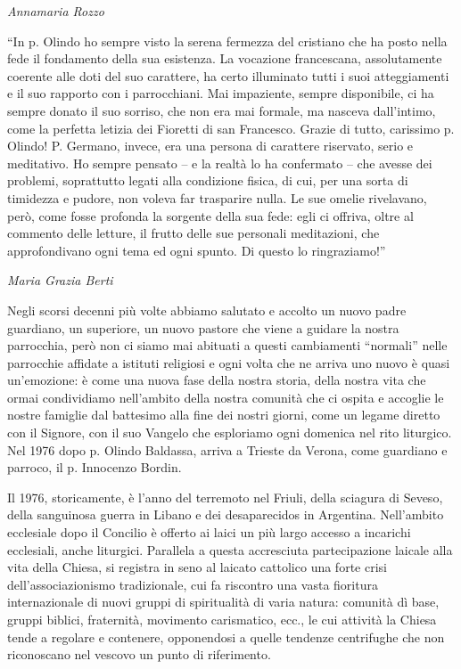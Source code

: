 \begin{flushright}
\textit{Annamaria Rozzo}
\end{flushright}
“In p. Olindo ho sempre visto la serena fermezza del cristiano che ha posto nella fede il 
fondamento della sua esistenza. La vocazione francescana, assolutamente coerente alle doti del suo 
carattere, ha certo illuminato tutti i suoi atteggiamenti e il suo rapporto con i parrocchiani. Mai 
impaziente, sempre disponibile, ci ha sempre donato il suo sorriso, che non era mai formale, ma 
nasceva dall’intimo, come la perfetta letizia dei Fioretti di san Francesco.
Grazie di tutto, carissimo p. Olindo! 
\medbreak
P. Germano, invece, era una persona di carattere riservato, serio e meditativo. Ho sempre 
pensato – e la realtà lo ha confermato – che avesse dei problemi, soprattutto legati alla condizione 
fisica, di cui, per una sorta di timidezza e pudore, non voleva far trasparire nulla. Le sue omelie 
rivelavano, però, come fosse profonda la sorgente della sua fede: egli ci offriva, oltre al commento 
delle letture, il frutto delle sue personali meditazioni, che approfondivano ogni tema ed ogni spunto.
Di questo lo ringraziamo!”
\begin{flushright}
\textit{Maria Grazia Berti}
\end{flushright}
Negli scorsi decenni più volte abbiamo salutato e accolto un nuovo padre guardiano, un  
superiore, un nuovo pastore che viene a guidare la nostra parrocchia, però non ci siamo mai abituati 
a questi cambiamenti “normali” nelle parrocchie affidate a istituti religiosi e ogni volta che ne arriva 
uno nuovo è quasi un’emozione: è come una nuova fase della nostra storia, della nostra vita che 
ormai condividiamo nell’ambito della nostra comunità che ci ospita e accoglie le nostre famiglie dal 
battesimo alla fine dei nostri giorni, come un legame diretto con il Signore, con il suo Vangelo che 
esploriamo ogni domenica nel rito liturgico. Nel 1976 dopo p. Olindo Baldassa, arriva a Trieste da 
Verona,  come guardiano e parroco, il p. Innocenzo Bordin. 

Il 1976, storicamente, è l’anno del terremoto nel Friuli, della sciagura di Seveso, della  
sanguinosa guerra in Libano e dei desaparecidos in Argentina. Nell’ambito ecclesiale dopo il 
Concilio è offerto ai laici un più largo accesso a incarichi ecclesiali, anche liturgici. Parallela a 
questa accresciuta partecipazione laicale alla vita della Chiesa, si registra in seno al laicato cattolico 
una forte crisi dell'associazionismo tradizionale, cui fa riscontro una vasta fioritura internazionale di 
nuovi gruppi di spiritualità di varia natura: comunità dì base, gruppi biblici, fraternità, movimento 
carismatico, ecc., le cui attività la Chiesa tende a regolare e contenere, opponendosi a quelle 
tendenze centrifughe che non riconoscano nel vescovo un punto di riferimento.

